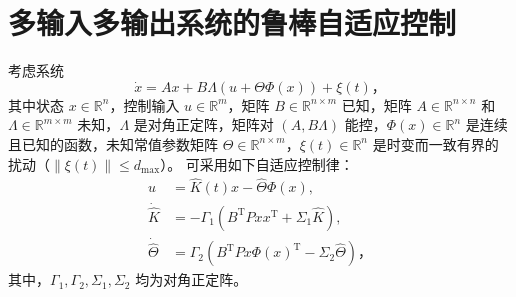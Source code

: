 \chapter{多输入多输出系统的鲁棒自适应控制} \label{MIMO_robust}


考虑系统
\begin{equation} \label{MIMO_sys_disturbance}
    \dot{x} = A x + B \Lambda (u + \Theta \Phi(x)) + \xi(t) \text{，}
\end{equation}
其中状态 $x \in \mathbb{R}^n$，控制输入 $u \in \mathbb{R}^m$，矩阵 $B \in \mathbb{R}^{n \times m}$ 已知，矩阵 $A \in \mathbb{R}^{n \times n}$ 和 $\Lambda \in \mathbb{R}^{m \times m}$ 未知，$\Lambda$ 是对角正定阵，矩阵对 $(A, B \Lambda)$ 能控，$\Phi(x) \in \mathbb{R}^n$ 是连续且已知的函数，未知常值参数矩阵 $\Theta \in \mathbb{R}^{n \times m}$，$\xi(t) \in \mathbb{R}^n$ 是时变而一致有界的扰动（$\| \xi(t) \| \leq d_{\mathrm{max}}$）。%
可采用如下自适应控制律：
\begin{align*}
    u &= \hat{K}(t)x - \hat{\Theta}\Phi(x), \\
    \dot{\hat{K}} &= - \Gamma_1 (B^\mathrm{T} P x x^\mathrm{T} + \Sigma_1\hat{K}), \\
    \dot{\hat{\Theta}} &= \Gamma_2(B^\mathrm{T} P x \Phi(x)^\mathrm{T} - \Sigma_2 \hat{\Theta}) \text{，}
\end{align*}
其中，$\Gamma_1, \Gamma_2, \Sigma_1, \Sigma_2$ 均为对角正定阵。

